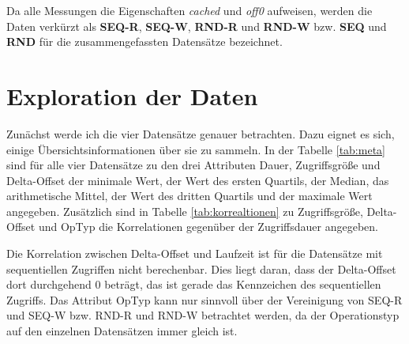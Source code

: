 \documentclass[
	12pt,
	a4paper,
	BCOR10mm,
	DIV14,
	listof=totoc,
	bibliography=totoc,
	headsepline
]{scrreprt}
\begin{document}
Da alle Messungen die Eigenschaften \textit{cached} und \textit{off0} aufweisen, werden die Daten verkürzt als \textbf{SEQ-R}, \textbf{SEQ-W}, \textbf{RND-R} und \textbf{RND-W} bzw. \textbf{SEQ} und \textbf{RND} für die zusammengefassten Datensätze bezeichnet. 

\section{Exploration der Daten}
\label{eval:exploration}
Zunächst werde ich die vier Datensätze genauer betrachten. Dazu eignet es sich, einige Übersichtsinformationen über sie zu sammeln.
In der Tabelle \ref{tab:meta} sind für alle vier Datensätze zu den drei Attributen Dauer, Zugriffsgröße und Delta-Offset der minimale Wert, der Wert des ersten Quartils, der Median, das arithmetische Mittel, der Wert des dritten Quartils und der maximale Wert angegeben. Zusätzlich sind in Tabelle \ref{tab:korrealtionen} zu Zugriffsgröße, Delta-Offset und OpTyp die Korrelationen gegenüber der Zugriffsdauer angegeben.\medskip

Die Korrelation zwischen Delta-Offset und Laufzeit ist für die Datensätze mit sequentiellen Zugriffen nicht berechenbar. Dies liegt daran, dass der Delta-Offset dort durchgehend 0 beträgt, das ist gerade das Kennzeichen des sequentiellen Zugriffs.
Das Attribut OpTyp kann nur sinnvoll über der Vereinigung von SEQ-R
und SEQ-W bzw. RND-R und RND-W betrachtet werden, da der Operationstyp auf den einzelnen Datensätzen immer gleich ist.
\end{document}
